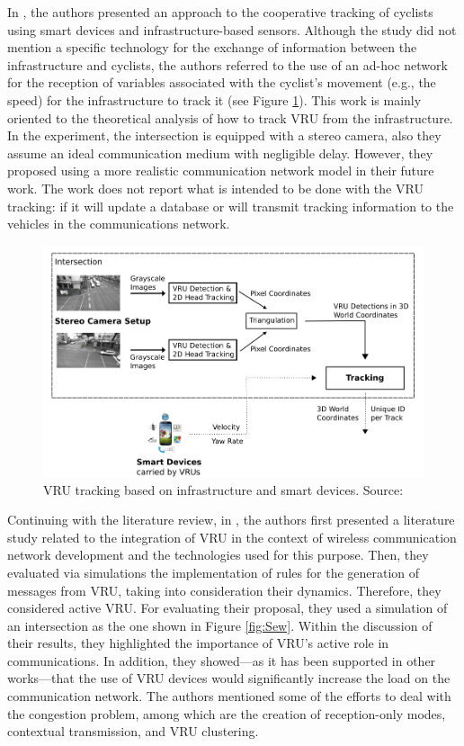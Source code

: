 In \cite{Reitberger2018}, the authors presented an approach to the cooperative tracking of cyclists using smart devices and infrastructure-based sensors. Although the study did not mention a specific technology for the exchange of information between the infrastructure and cyclists, the authors referred to the use of an ad-hoc network for the reception of variables associated with the cyclist's movement (e.g., the speed) for the infrastructure to track it (see Figure \ref{fig:Rei}). This work is mainly oriented to the theoretical analysis of how to track VRU from the infrastructure. In the experiment, the intersection is equipped with a stereo camera, also they assume an ideal communication medium with negligible
delay. However, they proposed using a more realistic communication network model in their future work. The work does not report what is intended to be done with the VRU tracking: if it will update a database or will transmit tracking information to the vehicles in the communications network.\begin{figure}[ht!]
    \centering
    \includegraphics[width=12cm]{FIGURES/Fig3.png}
    \caption{VRU tracking based on infrastructure and smart devices. Source: \cite{Reitberger2018}}
    \label{fig:Rei}
\end{figure}

Continuing with the literature review, in \cite{Sewalkar2019}, 
the authors first presented a literature study related to the integration of VRU in the context of wireless communication network development and the technologies used for this purpose. Then, they evaluated via simulations the implementation of rules for the generation of messages from VRU, taking into consideration their dynamics. Therefore, they considered active VRU. For evaluating their proposal, they used a simulation of an intersection as the one shown in Figure \ref{fig:Sew}. Within the discussion of their results, they highlighted the importance of VRU's active role in communications. In addition, they showed---as it has been supported in other works---that the use of VRU devices would significantly increase the load on the communication network. The authors mentioned some of the efforts to deal with the congestion problem, among which are the creation of reception-only modes, contextual transmission, and VRU clustering.

